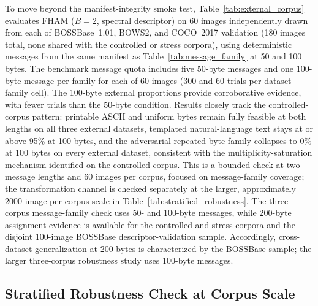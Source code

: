 \documentclass[preprint,12pt]{elsarticle}
\theoremstyle{plain}
\begin{document}
To move beyond the manifest-integrity smoke test, Table~\ref{tab:external_corpus}
evaluates FHAM ($B=2$, spectral descriptor) on 60 images independently drawn
from each of BOSSBase~1.01, BOWS2, and COCO~2017 validation (180 images total,
none shared with the controlled or stress corpora), using deterministic messages from the same manifest as Table~\ref{tab:message_family} at 50 and 100
bytes. The benchmark message quota includes five 50-byte messages and one
100-byte message per family for each of 60 images (300 and 60 trials per
dataset-family cell). The 100-byte external proportions provide corroborative
evidence, with fewer trials than the 50-byte condition. Results closely track
the controlled-corpus pattern: printable ASCII and uniform bytes remain fully
feasible at both lengths on all three external datasets, templated natural-language text stays
at or above 95\% at 100 bytes, and the adversarial repeated-byte family
collapses to 0\% at 100 bytes on every external dataset, consistent with the
multiplicity-saturation mechanism identified on the controlled corpus. This is
a bounded check at two message lengths and 60 images per corpus, focused on
message-family coverage; the transformation channel is checked separately at
the larger, approximately 2000-image-per-corpus scale in
Table~\ref{tab:stratified_robustness}. The three-corpus message-family check
uses 50- and 100-byte messages, while 200-byte assignment evidence is available
for the controlled and stress corpora and the disjoint 100-image BOSSBase
descriptor-validation sample. Accordingly, cross-dataset generalization at
200 bytes is characterized by the BOSSBase sample; the larger three-corpus
robustness study uses 100-byte messages.

\begin{table}[!t]
\centering
\caption{External-Corpus Assignment Feasibility by Dataset and Message Family (60 Images per Dataset)}
\label{tab:external_corpus}
\resizebox{\linewidth}{!}{}
\end{table}

\subsection{Stratified Robustness Check at Corpus Scale}
\end{document}
